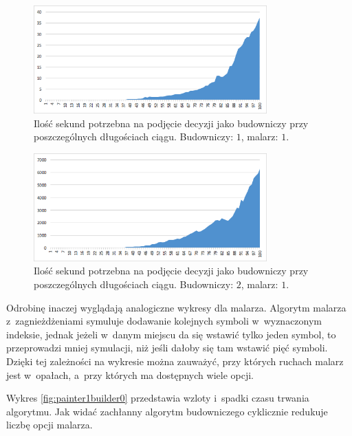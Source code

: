 \documentclass[document]{xmgr}
\begin{document}
\begin{figure}[tbh]
    \centering
    \includegraphics[width = 0.8\textwidth]{images/timeBuilder1Painter1}
    \caption{Ilość sekund potrzebna na podjęcie decyzji jako budowniczy przy poszczególnych długościach ciągu. Budowniczy: $1$, malarz: $1$.}
    \label{fig:builder1painter1}
\end{figure}

\begin{figure}[tbh]
    \centering
    \includegraphics[width = 0.8\textwidth]{images/timeBuilder2Painter1}
    \caption{Ilość sekund potrzebna na podjęcie decyzji jako budowniczy przy poszczególnych długościach ciągu. Budowniczy: $2$, malarz: $1$.}
    \label{fig:builder2painter1}
\end{figure}



Odrobinę inaczej wyglądają analogiczne wykresy dla malarza. Algorytm malarza z~zagnieżdżeniami symuluje dodawanie kolejnych symboli w~wyznaczonym indeksie, jednak jeżeli w~danym miejscu da się wstawić tylko jeden symbol, to przeprowadzi mniej symulacji, niż jeśli dałoby się tam wstawić pięć symboli. Dzięki tej zależności na wykresie można zauważyć, przy których ruchach malarz jest w~opałach, a~przy których ma dostępnych wiele opcji.

Wykres \ref{fig:painter1builder0} przedstawia wzloty i~spadki czasu trwania algorytmu. Jak widać zachłanny algorytm budowniczego cyklicznie redukuje liczbę opcji malarza.
\end{document}
